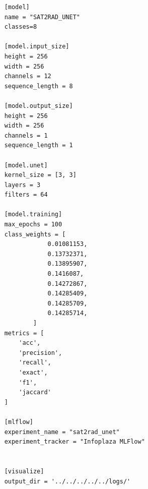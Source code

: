 \begin{listing}
  \begin{verbatim}
    [model]
    name = "SAT2RAD_UNET"
    classes=8
    
    [model.input_size]
    height = 256
    width = 256
    channels = 12
    sequence_length = 8
    
    [model.output_size]
    height = 256
    width = 256
    channels = 1
    sequence_length = 1
    
    [model.unet]
    kernel_size = [3, 3]
    layers = 3
    filters = 64
    
    [model.training]
    max_epochs = 100
    class_weights = [
                0.01081153,
                0.13732371,
                0.13895907,
                0.1416087,
                0.14272867,
                0.14285409,
                0.14285709,
                0.14285714,
            ]
    metrics = [
        'acc',
        'precision',
        'recall',
        'exact',
        'f1', 
        'jaccard'
    ]
    
    [mlflow]
    experiment_name = "sat2rad_unet"
    experiment_tracker = "Infoplaza MLFlow"
    
    
    [visualize]
    output_dir = '../../../../../logs/'
  \end{verbatim}
  \caption{toml configuration file for U-Net Model.}
  \label{lst:hello}
\end{listing}